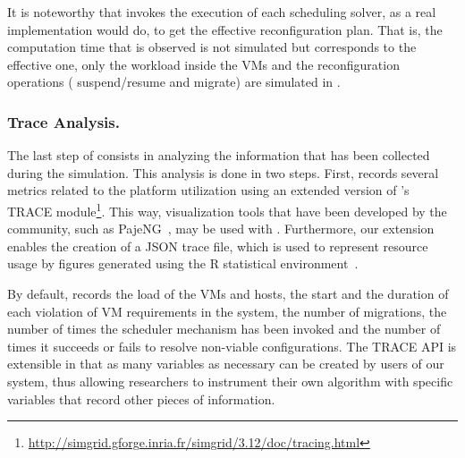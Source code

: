 It is noteworthy that \vmps invokes the execution of each scheduling
solver, as a real implementation would do, to get the effective
reconfiguration plan.  That is, the computation time that is observed
is not simulated but corresponds to the effective one, only the
workload inside the VMs and the reconfiguration operations (\ie
suspend/resume and migrate) are simulated in \sg.

\subsubsection{Trace Analysis.}
\label{subsec:traces-analysis}

The last step of \vmps consists in analyzing the information that has
been collected during the simulation.
This analysis is done in two steps. First, \vmps records several
metrics related to the platform
utilization %
using an extended version of \sg's TRACE
module\footnote{\url{http://simgrid.gforge.inria.fr/simgrid/3.12/doc/tracing.html}}.
This way, visualization tools that have been developed by the \sg
community, such as PajeNG~\cite{pageng:www}, may be used with
\vmps. Furthermore, our extension enables the creation of a JSON trace
file, which is used to represent resource usage by figures generated
using the R statistical environment~\cite{R:Bloomfield:2014}.

By default, \vmps records the load of the VMs and hosts, the
start and the duration of each violation of VM requirements in
the system, the number of migrations, the number of times the
scheduler mechanism has been invoked and the number of times it
succeeds or fails to resolve non-viable configurations.
%
The TRACE API is extensible in that as many variables as necessary can
be created by users of our system, thus allowing researchers to
instrument their own algorithm with specific variables that record
other pieces of information.




%

